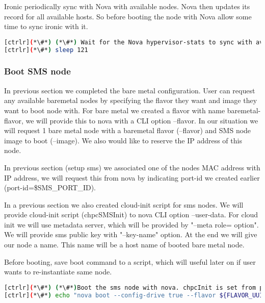  Ironic periodically sync with Nova with available nodes. Nova then updates its record for all available hosts. So before booting the node with Nova allow some time to sync ironic with it. 


\begin{lstlisting}[language=bash,keywords={}]
[ctrlr](*\#*) (*\#*) Wait for the Nova hypervisor-stats to sync with available Ironic resources
[ctrlr](*\#*) sleep 121
\end{lstlisting}

\subsubsection{Boot SMS node}

In previous section we completed the bare metal configuration. User can request any available baremetal nodes by specifying the flavor they want and image they want to boot node with. For bare metal we created a flavor with name baremetal-flavor, we will provide this to nova with a CLI option --flavor. In our situation we will request 1 bare metal node with a baremetal flavor (--flavor) and SMS node image to boot (--image).  We also would like to reserve the IP address of this node. 

In previous section (setup sms) we associated one of the nodes MAC address with IP address, we will request this from nova by indicating port-id we created earlier (port-id=\${SMS\_PORT\_ID}). 

In a previous section we also created cloud-init script for sms nodes. We will provide cloud-init script (chpcSMSInit) to nova CLI option --user-data. For cloud init we will use metadata server, which will be provided by "--meta role= option". We will provide sms public key with "--key-name" option. At the end we will give our node a name. This name will be a host name of booted bare metal node.

Before booting, save boot command to a script, which will useful later on if user wants to re-instantiate same node.

\begin{lstlisting}[language=bash,keywords={}]
[ctrlr](*\#*) (*\#*)Boot the sms node with nova. chpcInit is set from prepare_cloudInit
[ctrlr](*\#*) echo "nova boot --config-drive true --flavor ${FLAVOR_UUID} --image ${SMS_DISK_IMAGE_UUID} --key-name ${KEYPAIR_NAME} --meta role=webservers --user-data=$chpcSMSInit --nic port-id=${SMS_PORT_ID} ${sms_name}" > boot_sms
\end{lstlisting}

